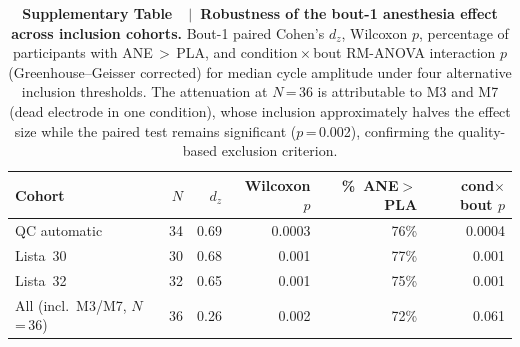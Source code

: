 \label{fig:supp_robust}
\begin{table}[!h]
\centering
\caption{\textbf{Supplementary Table~\thesuppfigure~$|$~Robustness of the
bout-1 anesthesia effect across inclusion cohorts.}
Bout-1 paired Cohen's $d_z$, Wilcoxon $p$, percentage of participants with
ANE\,$>$\,PLA, and condition\,$\times$\,bout RM-ANOVA interaction $p$
(Greenhouse--Geisser corrected) for median cycle amplitude under four
alternative inclusion thresholds.
The attenuation at $N$\,=\,36 is attributable to M3 and M7 (dead electrode in
one condition), whose inclusion approximately halves the effect size while the
paired test remains significant ($p$\,=\,0.002), confirming the
quality-based exclusion criterion.}
\label{tab:robustness}
\begin{tabular}{lrrrrr}
\toprule
Cohort & $N$ & $d_z$ & Wilcoxon $p$ & \%~ANE$>$PLA & cond$\times$bout $p$ \\
\midrule
QC automatic                     & 34 & 0.69 & 0.0003 & 76\% & 0.0004 \\
Lista~30                         & 30 & 0.68 & 0.001  & 77\% & 0.001  \\
Lista~32                         & 32 & 0.65 & 0.001  & 75\% & 0.001  \\
All (incl.\ M3/M7, $N$\,=\,36)  & 36 & 0.26 & 0.002  & 72\% & 0.061  \\
\bottomrule
\end{tabular}
\end{table}
